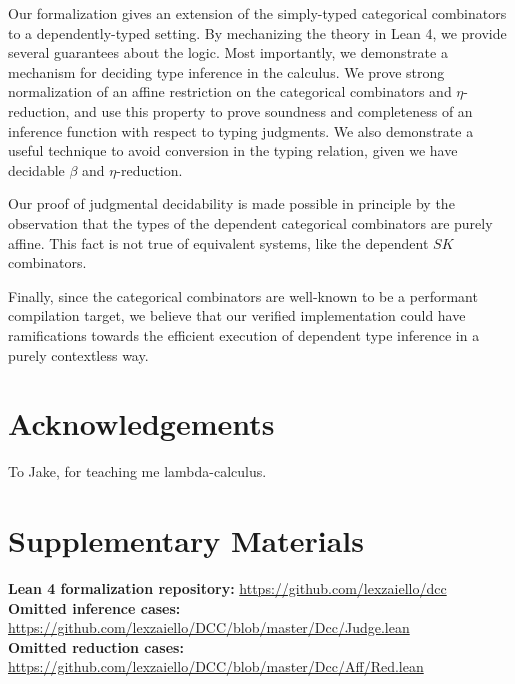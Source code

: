\documentclass{article}
\begin{document}
Our formalization gives an extension of the simply-typed categorical combinators \autocite[p. 220]{CURIEN1986188} to a dependently-typed setting. By mechanizing the theory in Lean 4, we provide several guarantees about the logic. Most importantly, we demonstrate a mechanism for deciding type inference in the calculus. We prove strong normalization of an affine restriction on the categorical combinators and \(\eta\)-reduction, and use this property to prove soundness and completeness of an inference function with respect to typing judgments. We also demonstrate a useful technique to avoid conversion in the typing relation, given we have decidable \(\beta\) and \(\eta\)-reduction.

Our proof of judgmental decidability is made possible in principle by the observation that the types of the dependent categorical combinators are purely affine. This fact is not true of equivalent systems, like the dependent \(SK\) combinators.

Finally, since the categorical combinators are well-known to be a performant compilation target, we believe that our verified implementation could have ramifications towards the efficient execution of dependent type inference in a purely contextless way.

\section*{Acknowledgements}

To Jake, for teaching me lambda-calculus.

\appendix

\section{Supplementary Materials}\label{appendix:sup}

\textbf{Lean 4 formalization repository:} \href{https://github.com/lexzaiello/dcc}{https://github.com/lexzaiello/dcc}\\
\textbf{Omitted inference cases:} \href{https://github.com/lexzaiello/DCC/blob/master/Dcc/Judge.lean}{https://github.com/lexzaiello/DCC/blob/master/Dcc/Judge.lean}\\
\textbf{Omitted reduction cases:} \href{https://github.com/lexzaiello/DCC/blob/master/Dcc/Aff/Red.lean}{https://github.com/lexzaiello/DCC/blob/master/Dcc/Aff/Red.lean}

\printbibliography
\end{document}

